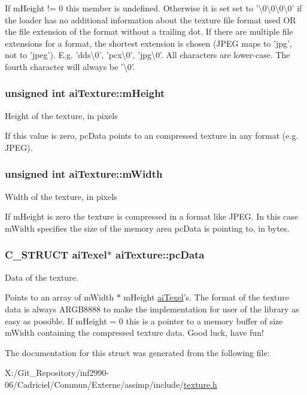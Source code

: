 If m\-Height != 0 this member is undefined. Otherwise it is set set to '\textbackslash{}0\textbackslash{}0\textbackslash{}0\textbackslash{}0' if the loader has no additional information about the texture file format used O\-R the file extension of the format without a trailing dot. If there are multiple file extensions for a format, the shortest extension is chosen (J\-P\-E\-G maps to 'jpg', not to 'jpeg'). E.\-g. 'dds\textbackslash{}0', 'pcx\textbackslash{}0', 'jpg\textbackslash{}0'. All characters are lower-\/case. The fourth character will always be '\textbackslash{}0'. \hypertarget{structai_texture_ac1e2fa6f1f646e9c55e3985d4418a752}{
\subsubsection[{m\-Height}]{\setlength{\rightskip}{0pt plus 5cm}unsigned int ai\-Texture\-::m\-Height}}\label{structai_texture_ac1e2fa6f1f646e9c55e3985d4418a752}
Height of the texture, in pixels

If this value is zero, pc\-Data points to an compressed texture in any format (e.\-g. J\-P\-E\-G). \hypertarget{structai_texture_aaa3ad8cfe44fdc4dea2db91977d92234}{
\subsubsection[{m\-Width}]{\setlength{\rightskip}{0pt plus 5cm}unsigned int ai\-Texture\-::m\-Width}}\label{structai_texture_aaa3ad8cfe44fdc4dea2db91977d92234}
Width of the texture, in pixels

If m\-Height is zero the texture is compressed in a format like J\-P\-E\-G. In this case m\-Width specifies the size of the memory area pc\-Data is pointing to, in bytes. \hypertarget{structai_texture_aeb07528748b6e49d2d81c60006024f9a}{
\subsubsection[{pc\-Data}]{\setlength{\rightskip}{0pt plus 5cm}C\-\_\-\-S\-T\-R\-U\-C\-T {\bf ai\-Texel}$\ast$ ai\-Texture\-::pc\-Data}}\label{structai_texture_aeb07528748b6e49d2d81c60006024f9a}
Data of the texture.

Points to an array of m\-Width $\ast$ m\-Height \hyperlink{structai_texel}{ai\-Texel}'s. The format of the texture data is always A\-R\-G\-B8888 to make the implementation for user of the library as easy as possible. If m\-Height = 0 this is a pointer to a memory buffer of size m\-Width containing the compressed texture data. Good luck, have fun! 

The documentation for this struct was generated from the following file\-:\begin{DoxyCompactItemize}
\item 
X\-:/\-Git\-\_\-\-Repository/inf2990-\/06/\-Cadriciel/\-Commun/\-Externe/assimp/include/\hyperlink{texture_8h}{texture.\-h}\end{DoxyCompactItemize}
